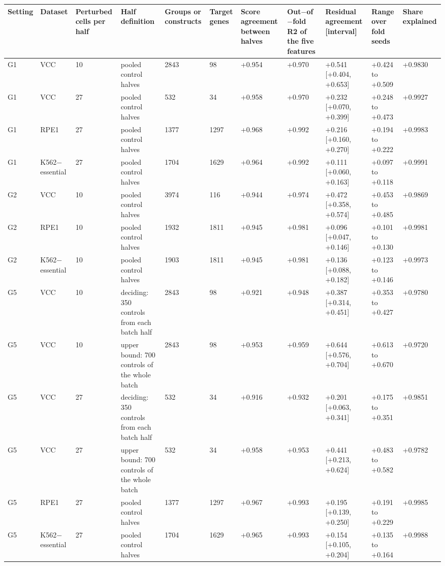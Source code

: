 \begin{tabular}{lllllllllll}
\toprule
Setting & Dataset & Perturbed cells per half & Half definition & Groups or constructs & Target genes & Score agreement between halves & Out$-$of$-$fold R2 of the five features & Residual agreement [interval] & Range over fold seeds & Share explained \\
\midrule
G1 & VCC & 10 & pooled control halves & 2843 & 98 & +0.954 & +0.970 & +0.541 [+0.404, +0.653] & +0.424 to +0.509 & +0.9830 \\
G1 & VCC & 27 & pooled control halves & 532 & 34 & +0.958 & +0.970 & +0.232 [+0.070, +0.399] & +0.248 to +0.473 & +0.9927 \\
G1 & RPE1 & 27 & pooled control halves & 1377 & 1297 & +0.968 & +0.992 & +0.216 [+0.160, +0.270] & +0.194 to +0.222 & +0.9983 \\
G1 & K562$-$essential & 27 & pooled control halves & 1704 & 1629 & +0.964 & +0.992 & +0.111 [+0.060, +0.163] & +0.097 to +0.118 & +0.9991 \\
G2 & VCC & 10 & pooled control halves & 3974 & 116 & +0.944 & +0.974 & +0.472 [+0.358, +0.574] & +0.453 to +0.485 & +0.9869 \\
G2 & RPE1 & 10 & pooled control halves & 1932 & 1811 & +0.945 & +0.981 & +0.096 [+0.047, +0.146] & +0.101 to +0.130 & +0.9981 \\
G2 & K562$-$essential & 10 & pooled control halves & 1903 & 1811 & +0.945 & +0.981 & +0.136 [+0.088, +0.182] & +0.123 to +0.146 & +0.9973 \\
G5 & VCC & 10 & deciding: 350 controls from each batch half & 2843 & 98 & +0.921 & +0.948 & +0.387 [+0.314, +0.451] & +0.353 to +0.427 & +0.9780 \\
G5 & VCC & 10 & upper bound: 700 controls of the whole batch & 2843 & 98 & +0.953 & +0.959 & +0.644 [+0.576, +0.704] & +0.613 to +0.670 & +0.9720 \\
G5 & VCC & 27 & deciding: 350 controls from each batch half & 532 & 34 & +0.916 & +0.932 & +0.201 [+0.063, +0.341] & +0.175 to +0.351 & +0.9851 \\
G5 & VCC & 27 & upper bound: 700 controls of the whole batch & 532 & 34 & +0.958 & +0.953 & +0.441 [+0.213, +0.624] & +0.483 to +0.582 & +0.9782 \\
G5 & RPE1 & 27 & pooled control halves & 1377 & 1297 & +0.967 & +0.993 & +0.195 [+0.139, +0.250] & +0.191 to +0.229 & +0.9985 \\
G5 & K562$-$essential & 27 & pooled control halves & 1704 & 1629 & +0.965 & +0.993 & +0.154 [+0.105, +0.204] & +0.135 to +0.164 & +0.9988 \\

\end{tabular}
